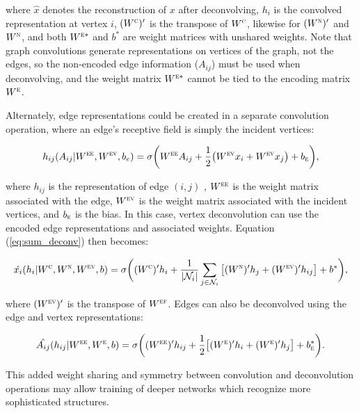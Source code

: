 \noindent
where $\hat{x}$ denotes the reconstruction of $x$ after deconvolving, $h_i$ is the convolved representation at vertex $i$, $(W^\textsc{c})'$ is the transpose of $W^\textsc{c}$, likewise for $(W^\textsc{n})'$ and $W^\textsc{n}$, and both $W^{\textsc{e}*}$ and $b^*$ are weight matrices with unshared weights. 
Note that graph convolutions generate representations on vertices of the graph, not the edges, so the non-encoded edge information ($A_{ij}$) must be used when deconvolving, and the weight matrix $W^{\textsc{e}*}$ cannot be tied to the encoding matrix $W^{\textsc{e}}$.

Alternately, edge representations could be created in a separate convolution operation, where an edge's receptive field is simply the incident vertices:

\begin{equation}
h_{ij}(A_{ij} |W^{\textsc{ee}}, W^{\textsc{ev}}, b_e) = \sigma\bigg( W^{\textsc{ee}} A_{ij} + \frac{1}{2}\big(
W^{\textsc{ev}} x_i + W^{\textsc{ev}} x_j \big) + b_\textsc{e} \bigg),
\label{eq:edge_conv}
\end{equation}

\noindent
where $h_{ij}$ is the representation of edge $(i, j)$ , $W^{\textsc{ee}}$ is the weight matrix associated with the edge, $W^{\textsc{ev}}$ is the weight matrix associated with the incident vertices, and $b_\textsc{e}$ is the bias.
In this case, vertex deconvolution can use the encoded edge representations and associated weights.
Equation (\ref{eq:sum_deconv}) then becomes:

\begin{equation}
\hat{x_i}(h_i | W^\textsc{c}, W^\textsc{n}, W^\textsc{ev}, b) = \sigma \bigg( (W^{\textsc{c}})' h_i + \frac{1}{|\mathcal{N}_i|}\sum_{j \in \mathcal{N}_i} \big[ (W^{\textsc{n}})' h_j + (W^{\textsc{ev}})' h_{ij} \big] + b^* \bigg),
\label{eq:sum_deconv2}
\end{equation}

\noindent
where $(W^{\textsc{ev}})'$ is the transpose of $W^{\textsc{ef}}$.
Edges can also be deconvolved using the edge and vertex representations:

\begin{equation}
\hat{A_{ij}}(h_{ij} | W^{\textsc{ee}}, W^{\textsc{e}}, b) = \sigma \bigg( (W^{\textsc{ee}})' h_{ij} + \frac{1}{2}\big[
(W^{\textsc{e}})' h_i + (W^{\textsc{e}})' h_j \big] + b^{*}_\textsc{e} \bigg).
\label{eq:edge_deconv}
\end{equation}

\noindent
This added weight sharing and symmetry between convolution and deconvolution operations may allow training of deeper networks which recognize more sophisticated structures.



